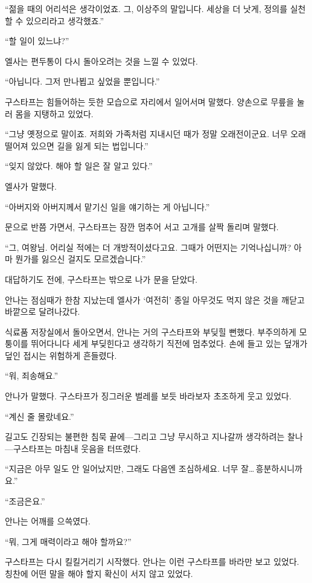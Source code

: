 ``젊을 때의 어리석은 생각이었죠. 그, 이상주의 말입니다. 세상을 더 낫게, 정의를 실천할 수 있으리라고 생각했죠.''

`` 할 일이 있느냐?''

엘사는 편두통이 다시 돌아오려는 것을 느낄 수 있었다.

``아닙니다. 그저 만나뵙고 싶었을 뿐입니다.''

구스타프는 힘들어하는 듯한 모습으로 자리에서 일어서며 말했다. 양손으로 무릎을 눌러 몸을 지탱하고 있었다.

``그냥 옛정으로 말이죠. 저희와 가족처럼 지내시던 때가 정말 오래전이군요. 너무 오래 떨어져 있으면 길을 잃게 되는 법입니다.''

``잊지 않았다. 해야 할 일은 잘 알고 있다.''

엘사가 말했다.

``아버지와 아버지께서 맡기신 일을 얘기하는 게 아닙니다.''

문으로 반쯤 가면서, 구스타프는 잠깐 멈추어 서고 고개를 살짝 돌리며 말했다.

``그, 여왕님. 어리실 적에는 더 개방적이셨다고요. 그때가 어떤지는 기억나십니까? 아마 뭔가를 잃으신 걸지도 모르겠습니다.''

대답하기도 전에, 구스타프는 밖으로 나가 문을 닫았다.

\textbreak

안나는 점심때가 한참 지났는데 엘사가 `여전히' 종일 아무것도 먹지 않은 것을 깨닫고 바깥으로 달려나갔다.

식료품 저장실에서 돌아오면서, 안나는 거의 구스타프와 부딪힐 뻔했다. 부주의하게 모퉁이를 뛰어다니다 세게 부딪힌다고 생각하기 직전에 멈추었다. 손에 들고 있는 덮개가 덮인 접시는 위험하게 흔들렸다.

``워, 죄송해요.''

안나가 말했다. 구스타프가 징그러운 벌레를 보듯 바라보자 초조하게 웃고 있었다.

``계신 줄 몰랐네요.''

길고도 긴장되는 불편한 침묵 끝에—그리고 그냥 무시하고 지나갈까 생각하려는 찰나—구스타프는 마침내 웃음을 터뜨렸다.

``지금은 아무 일도 안 일어났지만, 그래도 다음엔 조심하세요. 너무 잘\ldots\,흥분하시니까요.''

``조금은요.''

안나는 어깨를 으쓱였다.

``뭐, 그게 매력이라고 해야 할까요?''

구스타프는 다시 킬킬거리기 시작했다. 안나는 이런 구스타프를 바라만 보고 있었다. 칭찬에 어떤 말을 해야 할지 확신이 서지 않고 있었다.

